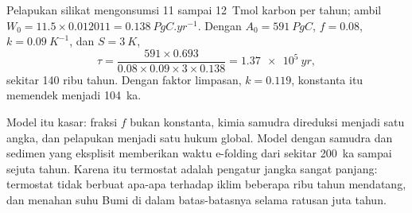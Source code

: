 \begin{example}\label{ex:b2:deep-time-climate:tau}
Pelapukan silikat mengonsumsi 11 sampai \qty{12}{Tmol} karbon per tahun; ambil $W_0 = 11.5\times0.012011
= \qty{0.138}{PgC.yr^{-1}}$. Dengan $A_0 = \qty{591}{PgC}$, $f = 0.08$, $k = \qty{0.09}{K^{-1}}$, dan
$S = \qty{3}{K}$,
\[
  \tau = \frac{591\times0.693}{0.08\times0.09\times3\times0.138} = \qty{1.37e5}{yr} ,
\]
sekitar 140 ribu tahun. Dengan faktor limpasan, $k = 0.119$, konstanta itu memendek menjadi
\qty{104}{ka}.
\end{example}

Model itu kasar: fraksi $f$ bukan konstanta, kimia samudra direduksi menjadi satu
angka, dan pelapukan menjadi satu hukum global. Model dengan samudra dan sedimen yang eksplisit memberikan
waktu e-folding dari sekitar \qty{200}{ka} sampai sejuta tahun. Karena itu termostat adalah
pengatur jangka sangat panjang: termostat tidak berbuat apa-apa terhadap iklim beberapa ribu tahun mendatang, dan
menahan suhu Bumi di dalam batas-batasnya selama ratusan juta tahun.

